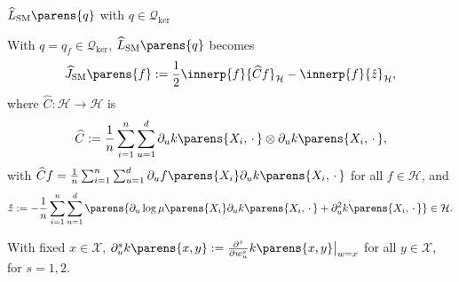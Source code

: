 \documentclass[aspectratio=169,xcolor=dvipsnames]{beamer}
\newcommand{\SM}{\mathrm{SM}}
\newcommand{\calX}{\mathcal{X}}
\begin{document}
\begin{frame}{$\widehat{L}_{\SM} \parens{q}$ with $q \in \mathcal{Q}_{\mathrm{ker}}$}
	
	With $q = q_f \in \mathcal{Q}_{\mathrm{ker}}$, $\widehat{L}_{\SM} \parens{q}$ becomes 
	\begin{align}
		\widehat{J}_{\SM} \parens{f} := %
		\frac{1}{2} \innerp{f}{\widehat{C} f}_{\mathcal{H}} - \innerp{f}{\hat{z}}_{\mathcal{H}}, 
	\end{align}
	where $\widehat{C}: \mathcal{H} \to \mathcal{H}$ is 
	\begin{align*}
		\widehat{C} := \frac{1}{n} \sum_{i=1}^n \sum_{u=1}^d \partial_u k \parens{X_i, \,\cdot\,} \otimes \partial_u k \parens{X_i, \,\cdot\,}, 
	\end{align*}
	with $\widehat{C} f = \frac{1}{n} \sum_{i=1}^n \sum_{u=1}^d \partial_u f \parens{X_i} \partial_u k \parens{X_i, \,\cdot\,}$ for all $f \in \mathcal{H}$, and 
	\begin{align*}
		\hat{z} := - \frac{1}{n} \sum_{i=1}^n \sum_{u=1}^d \parens{\partial_u \log \mu \parens{X_i} \partial_u k \parens{X_i, \,\cdot\,} + \partial_u^2 k \parens{X_i, \,\cdot\,}} \in \mathcal{H}. 
	\end{align*}
	
	With fixed $x \in \mathcal{X}$, $\partial_u^s k \parens{x, y} := \frac{\partial^s}{\partial w_u^s} k \parens{x, y}\big\vert_{w = x}$ for all $y \in \calX$, for $s = 1, 2$. %
	
\end{frame}
\end{document}
